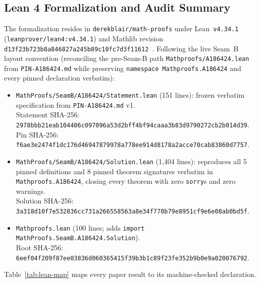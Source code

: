 \documentclass[11pt]{article}
\theoremstyle{definition}
\begin{document}
\subsection{Lean 4 Formalization and Audit Summary}

The formalization resides in \texttt{derekblair/math-proofs} under Lean~\texttt{v4.34.1} (\nolinkurl{leanprover/lean4:v4.34.1}) and Mathlib revision {\small\nolinkurl{d13f23b723b8a846827a245b89c10fc7d3f11612}}~\cite{mathlib4}. Following the live Seam~B layout convention (reconciling the pre-Seam-B path \nolinkurl{Mathproofs/A186424.lean} from \texttt{PIN-A186424.md} while preserving \nolinkurl{namespace Mathproofs.A186424} and every pinned declaration verbatim):
\begin{itemize}\setlength{\itemsep}{2pt}
\item \nolinkurl{MathProofs/SeamB/A186424/Statement.lean} (151 lines): frozen verbatim specification from \texttt{PIN-A186424.md} v1.\\
Statement SHA-256: {\small\nolinkurl{2978bbb21eab104406c097096a53d2bff4bf94caaa3b83d9790272cb2b014d39}}.\\
Pin SHA-256: {\small\nolinkurl{f6ae3e2474f1dc176d46947879978a778ee914d8178a2acce70cab83860d7757}}.
\item \nolinkurl{MathProofs/SeamB/A186424/Solution.lean} (1{,}404 lines): reproduces all 5 pinned definitions and 8 pinned theorem signatures verbatim in \nolinkurl{Mathproofs.A186424}, closing every theorem with zero \texttt{sorry}s and zero warnings.\\
Solution SHA-256: {\small\nolinkurl{3a318d10f7e532836cc731a266558563a8e34f770b79e8951cf9e6e08ab0bd5f}}.
\item \nolinkurl{Mathproofs.lean} (100 lines; adds \texttt{import MathProofs.SeamB.A186424.Solution}).\\
Root SHA-256: {\small\nolinkurl{6eef04f209f87ee03836d060365415f39b3b1c89f23fe352b9b0e9a020076792}}.
\end{itemize}

Table~\ref{tab:lean-map} maps every paper result to its machine-checked declaration.
\end{document}
